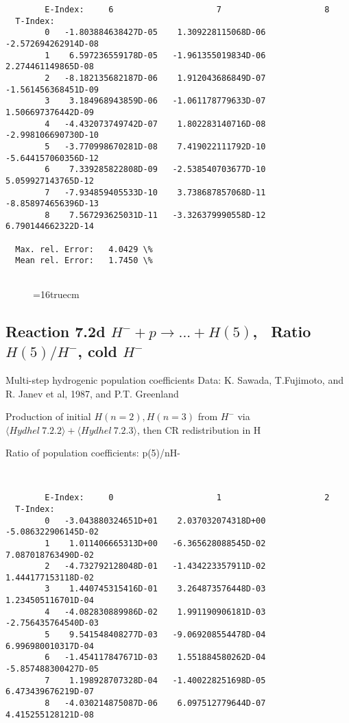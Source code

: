 \documentclass[12pt,dvipdfmx]{article}
\begin{document}
{\begin{small}
\begin{verbatim}
        E-Index:     6                     7                     8
  T-Index:
        0   -1.803884638427D-05    1.309228115068D-06   -2.572694262914D-08
        1    6.597236559178D-05   -1.961355019834D-06    2.274461149865D-08
        2   -8.182135682187D-06    1.912043686849D-07   -1.561456368451D-09
        3    3.184968943859D-06   -1.061178779633D-07    1.506697376442D-09
        4   -4.432073749742D-07    1.802283140716D-08   -2.998106690730D-10
        5   -3.770998670281D-08    7.419022111792D-10   -5.644157060356D-12
        6    7.339285822808D-09   -2.538540703677D-10    5.059927143765D-12
        7   -7.934859405533D-10    3.738687857068D-11   -8.858974656396D-13
        8    7.567293625031D-11   -3.326379990558D-12    6.790144662322D-14

  Max. rel. Error:   4.0429 \%
  Mean rel. Error:   1.7450 \%


\end{verbatim}\end{small}
\begin{figure} \label{7.2c}
\epsfxsize=16truecm
\end{figure}
\newpage

\subsection{
Reaction 7.2d $ H^- + p \rightarrow ...+ H(5) $, \   Ratio $H(5)/H^- $, cold $H^-$
}
 Multi-step hydrogenic population coefficients
 Data: K. Sawada, T.Fujimoto, \cite{kn:Sawada} and R. Janev et al, 1987, and P.T. Greenland

Production of initial $H(n=2), H(n=3)$ from $H^-$ via $ \langle Hydhel~ 7.2.2\rangle + \langle Hydhel~ 7.2.3\rangle$,
 then CR redistribution in H

 Ratio of population coefficients: p(5)/nH-


\begin{small}\begin{verbatim}


        E-Index:     0                     1                     2
  T-Index:
        0   -3.043880324651D+01    2.037032074318D+00   -5.086322906145D-02
        1    1.011406665313D+00   -6.365628088545D-02    7.087018763490D-02
        2   -4.732792128048D-01   -1.434223357911D-02    1.444177153118D-02
        3    1.440745315416D-01    3.264873576448D-03    1.234505116701D-04
        4   -4.082830889986D-02    1.991190906181D-03   -2.756435764540D-03
        5    9.541548408277D-03   -9.069208554478D-04    6.996980010317D-04
        6   -1.454117847671D-03    1.551884580262D-04   -5.857488300427D-05
        7    1.198928707328D-04   -1.400228251698D-05    6.473439676219D-07
        8   -4.030214875087D-06    6.097512779644D-07    4.415255128121D-08


\end{verbatim}
\end{small}}
\end{document}
